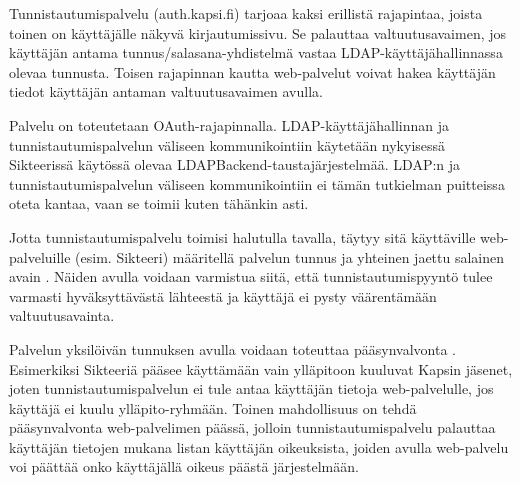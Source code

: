 Tunnistautumispalvelu (auth.kapsi.fi) tarjoaa kaksi erillistä rajapintaa, joista toinen on käyttäjälle näkyvä kirjautumissivu. Se palauttaa valtuutusavaimen, jos käyttäjän antama tunnus/salasana-yhdistelmä vastaa LDAP-käyttäjähallinnassa olevaa tunnusta. Toisen rajapinnan kautta web-palvelut voivat hakea käyttäjän tiedot käyttäjän antaman valtuutusavaimen avulla.

Palvelu on toteutetaan OAuth-rajapinnalla. LDAP-käyttäjähallinnan ja tunnistautumispalvelun väliseen kommunikointiin käytetään nykyisessä Sikteerissä käytössä olevaa LDAPBackend-taustajärjestelmää. LDAP:n ja tunnistautumispalvelun väliseen kommunikointiin ei tämän tutkielman puitteissa oteta kantaa, vaan se toimii kuten tähänkin asti.

Jotta tunnistautumispalvelu toimisi halutulla tavalla, täytyy sitä käyttäville web-palveluille (esim. Sikteeri) määritellä palvelun tunnus ja yhteinen jaettu salainen avain \cite{oauth2_0}. Näiden avulla voidaan varmistua siitä, että tunnistautumispyyntö tulee varmasti hyväksyttävästä lähteestä ja käyttäjä ei pysty väärentämään valtuutusavainta.

Palvelun yksilöivän tunnuksen avulla voidaan toteuttaa pääsynvalvonta \cite{oauth2_0}. Esimerkiksi Sikteeriä pääsee käyttämään vain ylläpitoon kuuluvat Kapsin jäsenet, joten tunnistautumispalvelun ei tule antaa käyttäjän tietoja web-palvelulle, jos käyttäjä ei kuulu ylläpito-ryhmään. Toinen mahdollisuus on tehdä pääsynvalvonta web-palvelimen päässä, jolloin tunnistautumispalvelu palauttaa käyttäjän tietojen mukana listan käyttäjän oikeuksista, joiden avulla web-palvelu voi päättää onko käyttäjällä oikeus päästä järjestelmään.